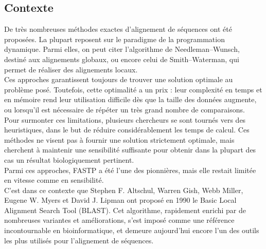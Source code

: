 \documentclass[conference]{IEEEtran}
\begin{document}
\subsection{Contexte}
De très nombreuses méthodes exactes d’alignement de séquences ont été proposées. La plupart reposent sur le paradigme de la programmation dynamique. Parmi elles, on peut citer l’algorithme de Needleman–Wunsch, destiné aux alignements globaux, ou encore celui de Smith–Waterman, qui permet de réaliser des alignements locaux.\\
Ces approches garantissent toujours de trouver une solution optimale au problème posé. Toutefois, cette optimalité a un prix : leur complexité en temps et en mémoire rend leur utilisation difficile dès que la taille des données augmente, ou lorsqu’il est nécessaire de répéter un très grand nombre de comparaisons.\\
Pour surmonter ces limitations, plusieurs chercheurs se sont tournés vers des heuristiques, dans le but de réduire considérablement les temps de calcul. Ces méthodes ne visent pas à fournir une solution strictement optimale, mais cherchent à maintenir une sensibilité suffisante pour obtenir dans la plupart des cas un résultat biologiquement pertinent.\\
Parmi ces approches, FASTP a été l’une des pionnières, mais elle restait limitée en vitesse comme en sensibilité.\\
C’est dans ce contexte que Stephen F. Altschul, Warren Gish, Webb Miller, Eugene W. Myers et David J. Lipman ont proposé en 1990 le Basic Local Alignment Search Tool (BLAST). Cet algorithme, rapidement enrichi par de nombreuses variantes et améliorations, s’est imposé comme une référence incontournable en bioinformatique, et demeure aujourd’hui encore l’un des outils les plus utilisés pour l’alignement de séquences.
\end{document}
